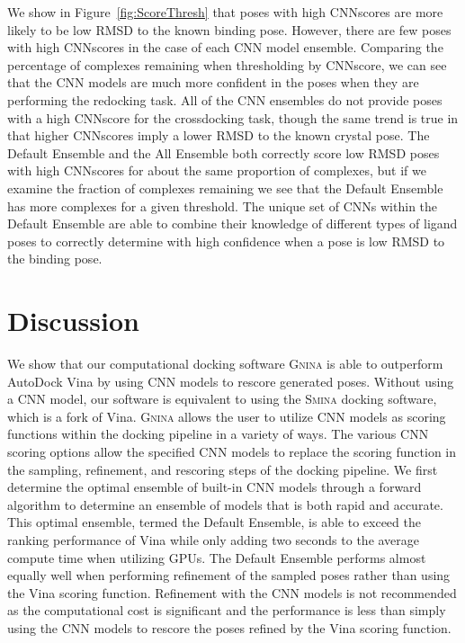\documentclass[journal=jcisd8,manuscript=article]{achemso}
\begin{document}
We show in Figure~\ref{fig:ScoreThresh} that poses with high CNNscores are more likely to be low RMSD to the known binding pose. However, there are few poses with high CNNscores in the case of each CNN model ensemble. Comparing the percentage of complexes remaining when thresholding by CNNscore, we can see that the CNN models are much more confident in the poses when they are performing the redocking task. All of the CNN ensembles do not provide poses with a high CNNscore for the crossdocking task, though the same trend is true in that higher CNNscores imply a lower RMSD to the known crystal pose. The Default Ensemble and the All Ensemble both correctly score low RMSD poses with high CNNscores for about the same proportion of complexes, but if we examine the fraction of complexes remaining we see that the Default Ensemble has more complexes for a given threshold. The unique set of CNNs within the Default Ensemble are able to combine their knowledge of different types of ligand poses to correctly determine with high confidence when a pose is low RMSD to the binding pose.

\section{Discussion}
We show that our computational docking software \textsc{Gnina} is able to outperform AutoDock Vina by using CNN models to rescore generated poses. Without using a CNN model, our software is equivalent to using the \textsc{Smina} docking software, which is a fork of Vina. \textsc{Gnina} allows the user to utilize CNN models as scoring functions within the docking pipeline in a variety of ways. The various CNN scoring options allow the specified CNN models to replace the scoring function in the sampling, refinement, and rescoring steps of the docking pipeline. We first determine the optimal ensemble of built-in CNN models through a forward algorithm to determine an ensemble of models that is both rapid and accurate. This optimal ensemble, termed the Default Ensemble, is able to exceed the ranking performance of Vina while only adding two seconds to the average compute time when utilizing GPUs. The Default Ensemble performs almost equally well when performing refinement of the sampled poses rather than using the Vina scoring function. Refinement with the CNN models is not recommended as the computational cost is significant and the performance is less than simply using the CNN models to rescore the poses refined by the Vina scoring function.
\end{document}
